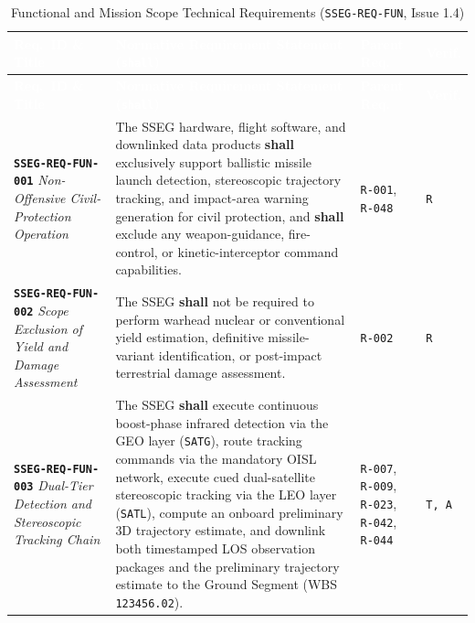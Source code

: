 \documentclass[11pt,a4paper]{article}
\newcommand{\thead}[1]{\textcolor{white}{\textbf{\textsf{#1}}}}
\providecommand{\abbr}[1]{#1}
\begin{document}
{\footnotesize\setlength{\tabcolsep}{4pt}\renewcommand{\arraystretch}{1.15}%
%
%
\setlength{\LTcapwidth}{\textwidth}%
\begin{longtable}{|>{\raggedright\arraybackslash}p{}|>{\raggedright\arraybackslash}p{}|>{\raggedright\arraybackslash}p{}|>{\raggedright\arraybackslash}p{}|}
\caption{Functional and Mission Scope Technical Requirements (\texttt{SSEG-REQ-FUN}, Issue 1.4)}\label{tab:req_fun_i14}\\
\hline
\rowcolor{TableHeaderBlue}
\thead{Req.\ ID \& Title} & \thead{Normative Requirement Statement (\texttt{shall})} & \thead{Parent Req.} & \thead{Verif.} \\ \hline
\endfirsthead
\hline
\rowcolor{TableHeaderBlue}
\thead{Req.\ ID \& Title} & \thead{Normative Requirement Statement (\texttt{shall})} & \thead{Parent Req.} & \thead{Verif.} \\ \hline
\endhead
\endfoot
\endlastfoot
\textbf{\texttt{SSEG-REQ-FUN-001}} \newline \emph{Non-Offensive Civil-Protection Operation} & The \abbr{SSEG} hardware, flight software, and downlinked data products \textbf{shall} exclusively support ballistic missile launch detection, stereoscopic trajectory tracking, and impact-area warning generation for civil protection, and \textbf{shall} exclude any weapon-guidance, fire-control, or kinetic-interceptor command capabilities. & \texttt{R-001}, \newline \texttt{R-048} & \texttt{R} \\ \hline
\textbf{\texttt{SSEG-REQ-FUN-002}} \newline \emph{Scope Exclusion of Yield and Damage Assessment} & The \abbr{SSEG} \textbf{shall} not be required to perform warhead nuclear or conventional yield estimation, definitive missile-variant identification, or post-impact terrestrial damage assessment. & \texttt{R-002} & \texttt{R} \\ \hline
\textbf{\texttt{SSEG-REQ-FUN-003}} \newline \emph{Dual-Tier Detection and Stereoscopic Tracking Chain} & The \abbr{SSEG} \textbf{shall} execute continuous boost-phase infrared detection via the \abbr{GEO} layer (\texttt{SATG}), route tracking commands via the mandatory \abbr{OISL} network, execute cued dual-satellite stereoscopic tracking via the \abbr{LEO} layer (\texttt{SATL}), compute an onboard preliminary 3D trajectory estimate, and downlink both timestamped \abbr{LOS} observation packages and the preliminary trajectory estimate to the Ground Segment (\abbr{WBS} \texttt{123456.02}). & \texttt{R-007}, \texttt{R-009}, \texttt{R-023}, \texttt{R-042}, \texttt{R-044} & \texttt{T, A} \\ \hline

\end{longtable}}
\end{document}

